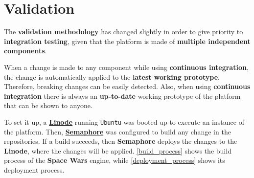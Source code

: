 \documentclass[a4paper,11pt,titlepage,abstract,numbers=noenddot,automark,mnsy,intlimits,rgb,dvipsnames]{report}
\begin{document}
\chapter{Validation}
\label{methodology}
The \textbf{validation methodology} has changed slightly in order to give priority to \textbf{integration testing}, given that
the platform is made of \textbf{multiple independent components}.

When a change is made to any component while using \textbf{continuous integration}, the change is automatically applied to
the \textbf{latest working prototype}. Therefore, breaking changes can be easily detected. Also, when using  \textbf{continuous
integration} there is always an \textbf{up-to-date} working prototype of the platform that can be shown to anyone.

To set it up, a \href{http://linode.com/}{\textbf{Linode}} running \texttt{Ubuntu} was booted up to execute an instance of
the platform. Then, \href{http://semaphoreci.com/}{\textbf{Semaphore}} was configured to build any change in the
repositories. If a build succeeds, then \textbf{Semaphore} deploys the changes to the \textbf{Linode}, where the changes will
be applied. \autoref{build_process} shows the build process of the \textbf{Space Wars} engine, while
\autoref{deployment_process} shows its deployment process.
\end{document}
